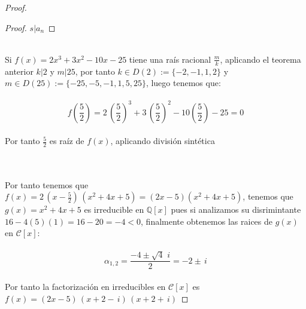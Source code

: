 \documentclass[11pt,letterpaper]{article}
\newcommand{\C}{\mathcal{C}}
\newcommand{\Q}{\mathbb{Q}}
\begin{document}
\begin{proof}
\begin{proof}
        $s|a_n$
    \end{proof}\,\\
    Si $f(x)=2x^3+3x^2-10x-25$ tiene una ra\'is racional $\frac{m}{k}$, aplicando el teorema anterior $k|2$ y $m|25$, por tanto $k\in D(2):=\{-2,-1,1,2\}$ y $m\in D(25):=\{-25,-5,-1,1,5,25\}$, luego tenemos que:\,\\
    \,\\
    \begin{equation*}
        f\left(\frac{5}{2}\right)=2\,\left(\frac{5}{2}\right)^3+3\,\left(\frac{5}{2}\right)^2-10\left(\frac{5}{2}\right)-25=0
    \end{equation*}\,\\
    Por tanto $\frac{5}{2}$ es ra\'iz de $f(x)$, aplicando divisi\'on sint\'etica\,\\
    \,\\
    \begin{center}
\end{center}\,\\
Por tanto tenemos que $f(x)=2\,\left(x-\frac{5}{2}\right)\,(x^2+4x+5)=(2x-5)(x^2+4x+5)$, tenemos que $g(x)=x^2+4x+5$ es irreducible en $\Q[x]$ pues si analizamos su disrimintante
$16-4(5)(1)=16-20=-4<0$, finalmente obtenemos las raices de $g(x)$ en $\C[x]$:\,\\
\,\\
\begin{equation*}
    \alpha_{1,2}=\frac{-4\pm\sqrt{4}\,\,i}{2}=-2\pm\,i
\end{equation*}\,\\
Por tanto la factorizaci\'on en irreducibles en $\C[x]$ es $f(x)=(2x-5)\,(x+2-\,i)\,(x+2+\,i)$
\end{proof}\,\\
\end{document}
